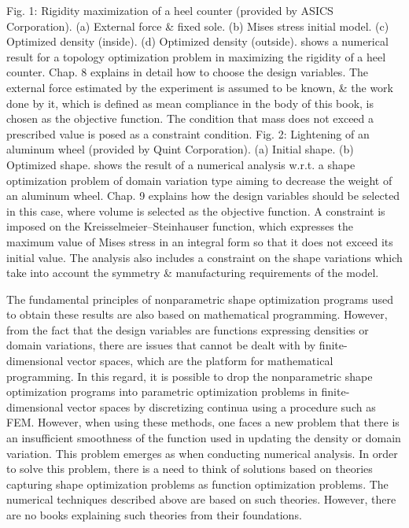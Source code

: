 \documentclass[oneside]{book}
\numberwithin{equation}{section}
\begin{document}
\textsf{Fig. 1: Rigidity maximization of a heel counter (provided by ASICS Corporation). (a) External force \& fixed sole. (b) Mises stress initial model. (c) Optimized density (inside). (d) Optimized density (outside).} shows a numerical result for a topology optimization problem in maximizing the rigidity of a heel counter. Chap. 8 explains in detail how to choose the design variables. The external force estimated by the experiment is assumed to be known, \& the work done by it, which is defined as mean compliance in the body of this book, is chosen as the objective function. The condition that mass does not exceed a prescribed value is posed as a constraint condition. \textsf{Fig. 2: Lightening of an aluminum wheel (provided by Quint Corporation). (a) Initial shape. (b) Optimized shape.} shows the result of a numerical analysis w.r.t. a shape optimization problem of domain variation type aiming to decrease the weight of an aluminum wheel. Chap. 9 explains how the design variables should be selected in this case, where volume is selected as the objective function. A constraint is imposed on the Kreisselmeier--Steinhauser function, which expresses the maximum value of Mises stress in an integral form so that it does not exceed its initial value. The analysis also includes a constraint on the shape variations which take into account the symmetry \& manufacturing requirements of the model.

The fundamental principles of nonparametric shape optimization programs used to obtain these results are also based on mathematical programming. However, from the fact that the design variables are functions expressing densities or domain variations, there are issues that cannot be dealt with by finite-dimensional vector spaces, which are the platform for mathematical programming. In this regard, it is possible to drop the nonparametric shape optimization programs into parametric optimization problems in finite-dimensional vector spaces by discretizing continua using a procedure such as FEM. However, when using these methods, one faces a new problem that there is an insufficient smoothness of the function used in updating the density or domain variation. This problem emerges as  when conducting numerical analysis. In order to solve this problem, there is a need to think of solutions based on theories capturing shape optimization problems as function optimization problems. The numerical techniques described above are based on such theories. However, there are no books explaining such theories from their foundations.
\end{document}
